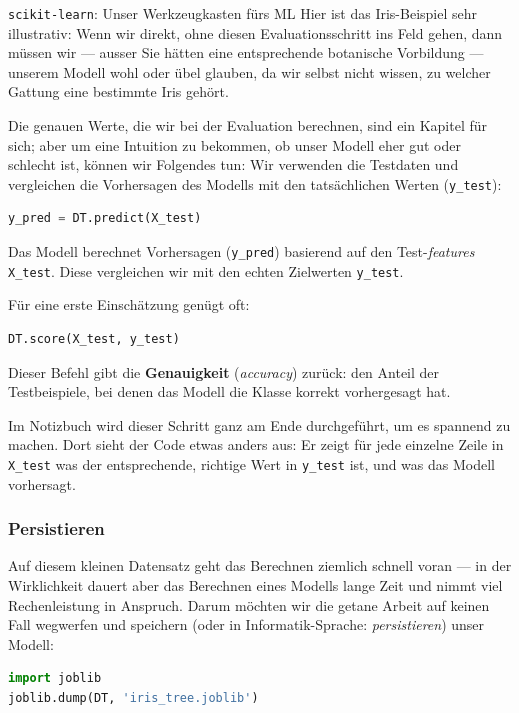 \begin{lpu}{\texttt{scikit-learn}: Unser Werkzeugkasten fürs ML}
Hier ist das Iris-Beispiel sehr illustrativ: Wenn wir direkt, ohne diesen Evaluationsschritt ins Feld gehen, dann müssen wir — ausser Sie hätten eine entsprechende botanische Vorbildung — unserem Modell wohl oder übel glauben, da wir selbst nicht wissen, zu welcher Gattung eine bestimmte Iris gehört.

Die genauen Werte, die wir bei der Evaluation berechnen, sind ein Kapitel für sich; aber um eine Intuition zu bekommen, ob unser Modell eher gut oder schlecht ist, können wir Folgendes tun: Wir verwenden die Testdaten und vergleichen die Vorhersagen des Modells mit den tatsächlichen Werten (\texttt{y\_test}):

\begin{lstlisting}[language=Python]
y_pred = DT.predict(X_test)
\end{lstlisting}

Das Modell berechnet Vorhersagen (\texttt{y\_pred}) basierend auf den Test-\textit{features} \texttt{X\_test}. Diese vergleichen wir mit den echten Zielwerten \texttt{y\_test}.

Für eine erste Einschätzung genügt oft:

\begin{lstlisting}[language=Python]
DT.score(X_test, y_test)
\end{lstlisting}

Dieser Befehl gibt die \textbf{Genauigkeit} (\textit{accuracy}) zurück: den Anteil der Testbeispiele, bei denen das Modell die Klasse korrekt vorhergesagt hat.

Im Notizbuch wird dieser Schritt ganz am Ende durchgeführt, um es spannend zu machen. Dort sieht der Code etwas anders aus: Er zeigt für jede einzelne Zeile in \texttt{X\_test} was der entsprechende, richtige Wert in \texttt{y\_test} ist, und was das Modell vorhersagt.


\subsubsection*{Persistieren}
Auf diesem kleinen Datensatz geht das Berechnen ziemlich schnell voran — in der Wirklichkeit dauert aber das Berechnen eines Modells lange Zeit und nimmt viel Rechenleistung in Anspruch. Darum möchten wir die getane Arbeit auf keinen Fall wegwerfen und speichern (oder in Informatik-Sprache: \textit{persistieren}) unser Modell:

\begin{lstlisting}[language=Python]
import joblib
joblib.dump(DT, 'iris_tree.joblib')
\end{lstlisting}


\end{lpu}

